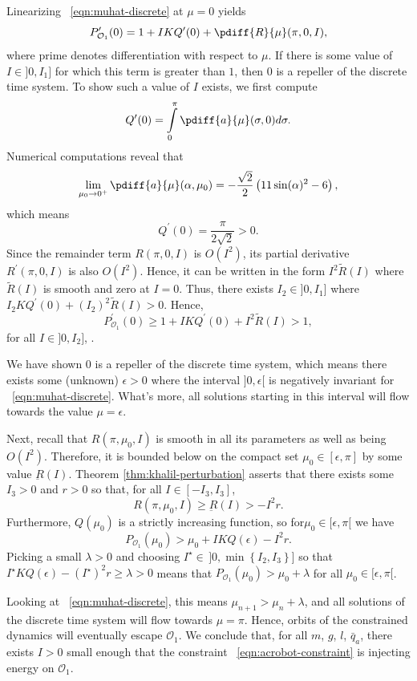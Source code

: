 Linearizing ~\eqref{eqn:muhat-discrete} at \(\mu = 0\) yields
\[
    P^\prime_{\mathcal{O}_1}(0) = 1 + I K Q^\prime(0) +
    \pdiff{R}{\mu}(\pi,0,I)
    ,
\]
where prime denotes differentiation with respect to \(\mu\).
If there is some value of \(I \in ]0,I_1]\) for which this term is greater than
\(1\), then \(0\) is a repeller of the discrete time system.
To show such a value of \(I\) exists, we first compute 
\[
    Q^\prime(0) = \int \limits_0^\pi \pdiff{a}{\mu}(\sigma,0) d\sigma
    .
\]
Numerical computations reveal that 
\[
    \lim \limits_{\mu_0 \to 0^+}
    \pdiff{a}{\mu}(\alpha,\mu_0) 
    = -\frac{\sqrt{2}}{2} \left(11\sin(\alpha)^2 - 6\right)
    ,
\]
which means 
\[
    Q^\prime(0)  = \frac{\pi}{2\sqrt{2}} > 0
    .
\]
Since the remainder term \(R(\pi,0,I)\) is \(O(I^2)\), 
its partial derivative \(R^\prime(\pi,0,I)\) is also \(O(I^2)\).
Hence, it can be written in the form
\(I^2 \tilde{R}(I)\) where \(\tilde{R}(I)\) is smooth and
zero at \(I = 0\).
Thus, there exists \(I_2 \in ]0,I_1]\) where 
\(I_2 K Q^\prime(0) + (I_2)^2 \tilde{R}(I) > 0\).
Hence,
\[
    P^\prime_{\mathcal{O}_1}(0) \geq 1 + IKQ^\prime(0) + I^2 \tilde{R}(I) 
    > 1
    ,
\] 
for all \(I \in ]0, I_2]\), .

We have shown \(0\) is a repeller of the discrete time system, which means
there exists some (unknown) \(\epsilon > 0\) where the interval
\(]0,\epsilon[\) is negatively invariant for ~\eqref{eqn:muhat-discrete}.
What's more, all solutions starting in this interval will flow towards the value
\(\mu = \epsilon\).

Next, recall that \(R(\pi,\mu_0,I)\) is smooth in all its parameters as well as
being \(O(I^2)\).
Therefore, it is bounded below on the compact set \(\mu_0 \in [\epsilon,\pi]\)
by some value \(\underbar{R}(I)\). 
Theorem \ref{thm:khalil-perturbation} asserts that there exists some
\(I_3 > 0\) and \(r > 0\) so that, for all \(I \in [-I_3, I_3]\),
\[
    R(\pi,\mu_0,I) \geq \underbar{R}(I) > -I^2 r
    .
\]
Furthermore, \(Q(\mu_0)\) is a strictly increasing function, so
for\(\mu_0 \in [\epsilon,\pi[\) we have
\[
    P_{\mathcal{O}_1}(\mu_0) > \mu_0 + I K Q(\epsilon) - I^2 r
    .
\]
Picking a small \(\lambda > 0\) and choosing 
\(I^\star \in\, ]0,\min\left\{I_2,I_3\right\}]\) so that
\(I^\star K Q(\epsilon) - (I^\star)^2 r \geq \lambda > 0\)
means that
\( P_{\mathcal{O}_1}(\mu_0) > \mu_0 + \lambda\)
for all \(\mu_0 \in [\epsilon,\pi[\).

Looking at ~\eqref{eqn:muhat-discrete}, this means
\(\mu_{n+1} > \mu_n + \lambda\), and all solutions of the discrete time system will flow
towards \(\mu = \pi\).
Hence, orbits of the constrained dynamics will eventually escape
\(\mathcal{O}_1\).
We conclude that, for all \(m\), \(g\), \(l\), \(\bar{q}_a\), 
there exists \(I > 0\) small enough that the constraint 
~\eqref{eqn:acrobot-constraint} is injecting energy on \(\mathcal{O}_1\).

